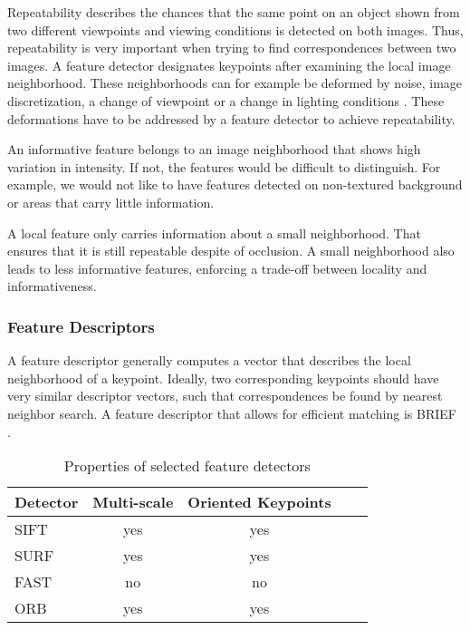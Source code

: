 Repeatability describes the chances that the same point on an object shown from
two different viewpoints and viewing conditions is detected on both images.
Thus, repeatability is very important when trying to find correspondences
between two images. A feature detector designates keypoints after examining the
local image neighborhood. These neighborhoods can for example be deformed by
noise, image discretization, a change of viewpoint or a change in lighting
conditions \cite{Tuytelaars2007}. These deformations have to be addressed by a
feature detector to achieve repeatability.

An informative feature belongs to an image neighborhood that shows high
variation in intensity. If not, the features would be difficult to distinguish.
For example, we would not like to have features detected on non-textured
background or areas that carry little information.

A local feature only carries information about a small neighborhood. That
ensures that it is still repeatable despite of occlusion. A small neighborhood
also leads to less informative features, enforcing a trade-off between locality
and informativeness.


\subsubsection{Feature Descriptors}

A feature descriptor generally computes a vector that describes the local
neighborhood of a keypoint. Ideally, two corresponding keypoints should have
very similar descriptor vectors, such that correspondences be found by
nearest neighbor search. A feature descriptor that allows for efficient
matching is BRIEF \cite{Calonder2010}. 

\begin{table}
    \begin{center}
        \begin{tabular}{lcccc}
            Detector & Multi-scale & Oriented Keypoints \\
            \hline
            SIFT & yes & yes \\
            SURF & yes & yes \\
            FAST & no & no \\
            ORB & yes & yes 
        \end{tabular}
    \end{center}
    \caption{Properties of selected feature detectors}
\end{table}

